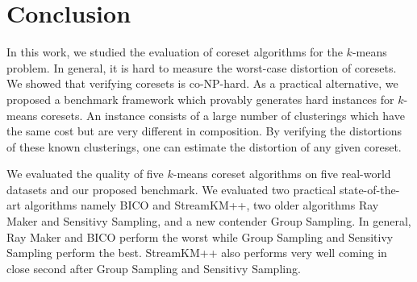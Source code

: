 \section{Conclusion} \label{sec:conclusion}
In this work, we studied the evaluation of coreset algorithms for the $k$-means problem. In general, it is hard to measure the worst-case distortion of coresets. We showed that verifying coresets is co-NP-hard. As a practical alternative, we proposed a benchmark framework which provably generates hard instances for $k$-means coresets. An instance consists of a large number of clusterings which have the same cost but are very different in composition. By verifying the distortions of these known clusterings, one can estimate the distortion of any given coreset.

We evaluated the quality of five $k$-means coreset algorithms on five real-world datasets and our proposed benchmark. We evaluated two practical state-of-the-art algorithms namely BICO and StreamKM++, two older algorithms Ray Maker and Sensitivy Sampling, and a new contender Group Sampling. In general, Ray Maker and BICO perform the worst while Group Sampling and Sensitivy Sampling perform the best. StreamKM++ also performs very well coming in close second after Group Sampling and Sensitivy Sampling.
